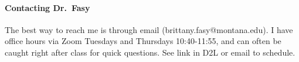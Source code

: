 \paragraph{Contacting Dr.~Fasy}
The best way to reach me is through email (brittany.fasy@montana.edu).  I have
office hours via Zoom Tuesdays and Thursdays 10:40-11:55, and can often be
caught right after class for quick questions.  See link in D2L or
email to schedule.
